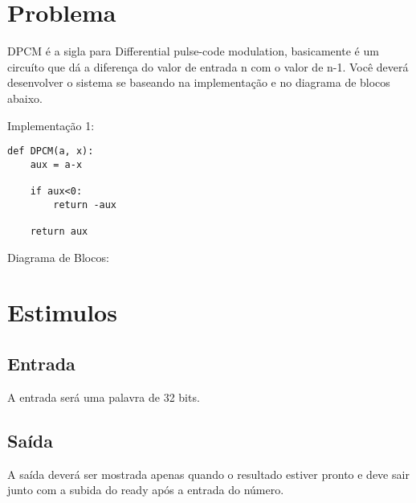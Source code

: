 \documentclass[
    12pt,
    a4paper,
    oneside,
    chapter=TITLE,
    section=TITLE,
    subsection=TITLE,
    subsubsection=TITLE,
    english,
    french,
    spanish,
    brazil,
    ]{abntex2}
\begin{document}
\frenchspacing 
\imprimircapa
\imprimirfolhaderosto

\tableofcontents*
\cleardoublepage

\textual

\chapter{Problema}
DPCM é a sigla para Differential pulse-code modulation, basicamente é um circuíto que dá a diferença do valor de entrada n com o valor de n-1. Você deverá desenvolver o sistema se baseando na implementação e no diagrama de blocos abaixo.

\par
Implementação 1:
\begin{lstlisting}
def DPCM(a, x):
    aux = a-x

    if aux<0:
        return -aux

    return aux
\end{lstlisting}

\par
Diagrama de Blocos:




\chapter{Estimulos}
\section{Entrada}
A entrada será uma palavra de 32 bits.
\section{Saída}
A saída deverá ser mostrada apenas quando o resultado estiver pronto e deve sair junto com a subida do ready após a entrada do número.
\end{document}
